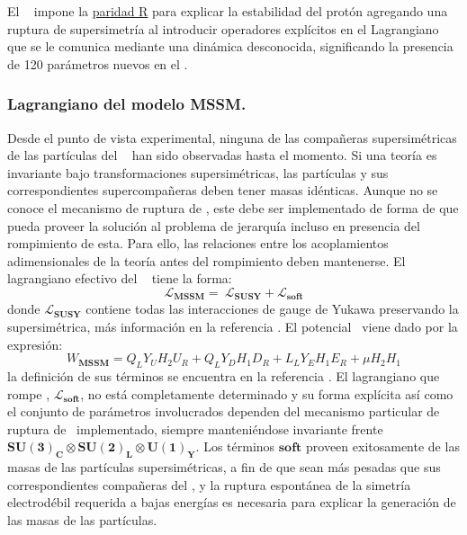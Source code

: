 El \MSSM ~ impone la \href{https://es.wikipedia.org/wiki/Paridad\_R}{paridad R} para explicar la estabilidad del protón agregando una ruptura de supersimetría al introducir operadores explícitos en el Lagrangiano que se le comunica mediante una dinámica desconocida, significando la presencia de 120 parámetros nuevos en el \MSSM. %

\subsubsection{Lagrangiano del modelo MSSM.}
Desde el punto de vista experimental, ninguna de las compañeras supersimétricas de las partículas del \ME ~ han sido observadas hasta el momento. Si una teoría es invariante bajo transformaciones supersimétricas, las partículas y sus correspondientes supercompañeras deben tener masas idénticas. %
Aunque no se conoce el mecanismo de ruptura de \SUSY, este debe ser implementado de forma de que pueda proveer la solución al problema de jerarquía incluso en presencia del rompimiento de esta. Para ello, las relaciones entre los acoplamientos adimensionales de la teoría antes del rompimiento deben mantenerse. El lagrangiano efectivo del \MSSM ~ tiene la forma:
\begin{equation}\label{lagrangianoMSSM}
\mathcal{L}_\mathbf{MSSM} = ~ \mathcal{L}_\mathbf{SUSY}+\mathcal{L}_\mathbf{soft}
\end{equation}
donde $\mathcal{L}_\mathbf{SUSY}$ contiene todas las interacciones de gauge de Yukawa preservando la supersimétrica, más información en la referencia \cite{kuroda_complete_2005}. El potencial \MSSM ~viene dado por la expresión:
\begin{equation}\label{potencialMSSM}
    W_\mathbf{MSSM} = Q_L Y_U H_2 U_R + Q_L Y_D H_1 D_R + L_L Y_E H_1 E_R + \mu H_2 H_1 
\end{equation}
la definición de sus términos se encuentra en la referencia \cite{kuroda_complete_2005}.
El lagrangiano que rompe \SUSY, $\mathcal{L}_\mathbf{soft}$, no está completamente determinado y su forma explícita así como el conjunto de parámetros involucrados dependen del mecanismo particular de ruptura de \SUSY ~implementado, siempre manteniéndose invariante frente $\mathbf{SU(3)_C} \otimes \mathbf{SU(2)_L} \otimes \mathbf{U(1)_Y}$. Los términos $\mathbf{soft}$ proveen exitosamente de las masas de las partículas supersimétricas, a fin de que sean más pesadas que sus correspondientes compañeras del \ME, y la ruptura espontánea de la simetría electrodébil requerida a bajas energías es necesaria para explicar la generación de las masas de las partículas.

